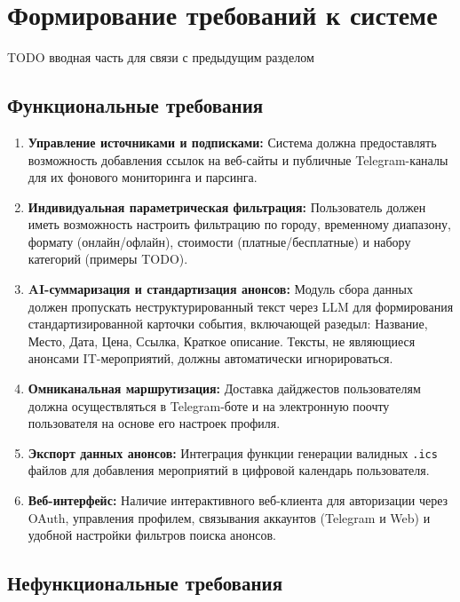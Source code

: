 \section{Формирование требований к системе}

TODO вводная часть для связи с предыдущим разделом

\subsection*{Функциональные требования}

\begin{enumerate}

\item \textbf{Управление источниками и подписками:} Система должна предоставлять возможность добавления ссылок на веб-сайты и публичные Telegram-каналы для их фонового мониторинга и парсинга.

\item \textbf{Индивидуальная параметрическая фильтрация:} Пользователь должен иметь возможность настроить фильтрацию по городу, временному диапазону, формату (онлайн/офлайн), стоимости (платные/бесплатные) и набору категорий (примеры TODO).

\item \textbf{AI-суммаризация и стандартизация анонсов:} Модуль сбора данных должен пропускать неструктурированный текст через LLM для формирования стандартизированной карточки события, включающей разедыл:
Название, Место, Дата, Цена, Ссылка, Краткое описание. 
Тексты, не являющиеся анонсами IT-мероприятий, должны автоматически игнорироваться.

\item \textbf{Омниканальная маршрутизация:} Доставка дайджестов пользователям должна осуществляться в Telegram-боте и на электронную поочту пользователя на основе его настроек профиля.

\item \textbf{Экспорт данных анонсов:} Интеграция функции генерации валидных \texttt{.ics} файлов для добавления мероприятий в цифровой календарь пользователя.

\item \textbf{Веб-интерфейс:} Наличие интерактивного веб-клиента для авторизации через OAuth, управления профилем, связывания аккаунтов (Telegram и Web) и удобной настройки фильтров поиска анонсов.

\end{enumerate}

\subsection*{Нефункциональные требования}

